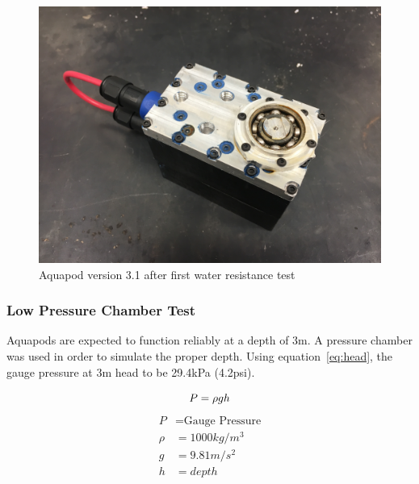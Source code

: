 \begin{figure}[h]
\centering
\includegraphics[width=1.0\columnwidth]{./img/aquaPod-test-one-rust.JPG}
\caption{Aquapod version 3.1 after first water resistance test}
\label{fig:pod rust}
\end{figure}



\subsubsection{Low Pressure Chamber Test}
Aquapods are expected to function reliably at a depth of 3m. A pressure chamber was used in order to simulate the proper depth. Using equation~\ref{eq:head}, the gauge pressure at 3m head to be 29.4kPa (4.2psi).

\begin{equation}\label{eq:head}
    P = \rho g h \\
\end{equation}
\begin{align*}
    P & = \text{Gauge Pressure}  \\
    \rho & = 1000 kg/m^3 \\
    g & = 9.81 m/s^2 \\
    h & = depth  \\
\end{align*}

